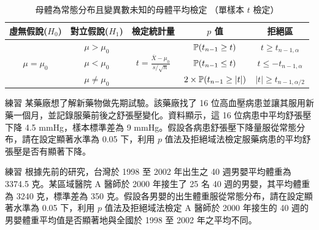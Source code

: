     \begin{table}[htbp]
        \begin{center}
            \begin{tabular}{ccccc}
                \toprule
                虛無假說($H_0$) & 對立假說($H_1$) & 檢定統計量 & $p$ 值 & 拒絕區\\
                \hline
                \multirow{3}{*}{$\mu = \mu_0$} & $\mu > \mu_0$ & \multirow{3}{*}{$t = \frac{\bar{X}-\mu_0}{s/\sqrt{n}}$} & $\mathbb{P}(t_{n-1} \ge t)$ & $t \ge t_{n-1,\alpha}$\\
                & $\mu < \mu_0$ & &$\mathbb{P}(t_{n-1} \le t)$&$t \le -t_{n-1,\alpha}$\\
                & $\mu \ne \mu_0$ & &$2\times\mathbb{P}(t_{n-1} \ge |t|)$&$|t| \ge t_{n-1,\alpha/2}$\\
                \bottomrule
            \end{tabular}
            \caption{母體為常態分布且變異數未知的母體平均檢定 （單樣本 $t$ 檢定）\label{tab:one_sample_t}}
        \end{center}
    \end{table}

    \bigskip

    \begin{custom}{練習}
        某藥廠想了解新藥物做先期試驗。該藥廠找了 16 位高血壓病患並讓其服用新藥一個月，並記錄服藥前後之舒張壓變化。資料顯示，這 16 位病患中平均舒張壓下降 4.5 mmHg，樣本標準差為 9 mmHg。假設各病患舒張壓下降量服從常態分布，請在設定顯著水準為 0.05 下，利用 $p$ 值法及拒絕域法檢定服藥病患的平均舒張壓是否有顯著下降。
    \end{custom}

    \bigskip

    \begin{custom}{練習}
        根據先前的研究，台灣於 1998 至 2002 年出生之 40 週男嬰平均體重為 3374.5 克。某區域醫院 A 醫師於 2000 年接生了 25 名 40 週的男嬰，其平均體重為 3240 克，標準差為 350 克。假設各男嬰的出生體重服從常態分布，請在設定顯著水準為 0.05 下，利用 $p$ 值法及拒絕域法檢定 A 醫師於 2000 年接生的 40 週的男嬰體重平均值是否顯著地與全國於 1998 至 2002 年之平均不同。
    \end{custom}

